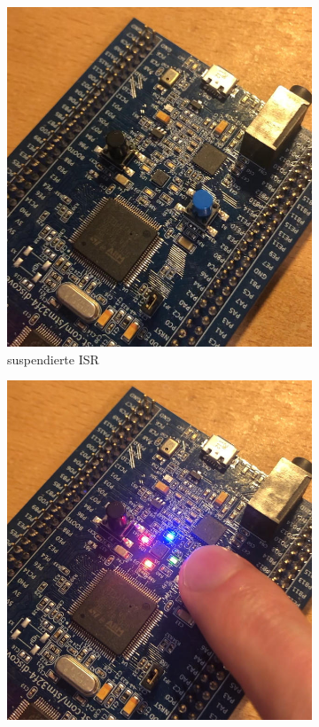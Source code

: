 \documentclass{llncs}
\begin{document}
\begin{figure}
	\centering
	\begin{subfigure}{.250\textwidth}
		\includegraphics[width=\linewidth]{EventFlagsAus.jpg}
		\caption{suspendierte ISR}
		\label{fig:EventFlagAus}
	\end{subfigure}
	\hspace{1em}
	\begin{subfigure}{.250\textwidth}
		\includegraphics[width=\linewidth]{EventFlagsAn.jpg}

\end{subfigure}
\end{figure}
\end{document}
